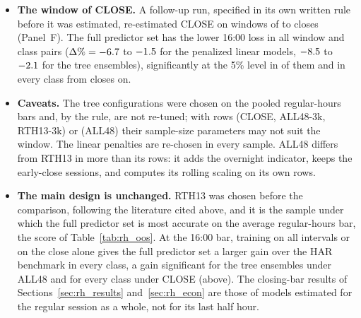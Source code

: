 \begin{itemize}
\item \textbf{The window of CLOSE.} A follow-up run, specified in its own written rule before it was estimated,
  re-estimated CLOSE on windows of \rhtaWsMin{} to \rhtaWsMax{} closes (Panel~F). The full predictor set has the
  lower 16:00 loss in all \rhtaWsNCells{} window and class pairs ($\Delta\% = -6.7$ to
  $-1.5$ for the penalized linear models, $-8.5$ to $-2.1$ for the tree
  ensembles), significantly at the 5\% level in \rhtaWsNSig{} of them and in every class from \rhtaWsSigFrom{} closes
  on.
\item \textbf{Caveats.} The tree configurations were chosen on the pooled regular-hours bars and, by the rule, are
  not re-tuned; with \rhtaRowsCl{} rows (CLOSE, ALL48-3k, RTH13-3k) or \rhtaRowsAll{} (ALL48) their sample-size
  parameters may not suit the window. The linear penalties are re-chosen in every sample. ALL48 differs from RTH13 in
  more than its rows: it adds the overnight indicator, keeps the early-close sessions, and computes its rolling
  scaling on its own rows.
\item \textbf{The main design is unchanged.} RTH13 was chosen before the comparison, following the literature cited
  above, and it is the sample under which the full predictor set is most accurate on the average regular-hours bar,
  the score of Table~\ref{tab:rh_oos}. At the 16:00 bar, training on all \rhtaNIntervals{} intervals or on the close
  alone gives the full predictor set a larger gain over the HAR benchmark in every class, a gain significant for the
  tree ensembles under ALL48 and for every class under CLOSE (above). The closing-bar results of
  Sections~\ref{sec:rh_results} and~\ref{sec:rh_econ} are those of models estimated for the regular session as a
  whole, not for its last half hour.
\end{itemize}

